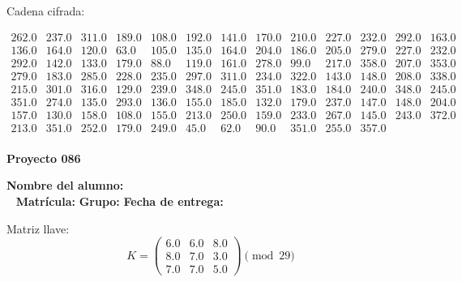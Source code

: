 \documentclass[12pt]{article}
\begin{document}
Cadena cifrada:
\begin{center}
$\begin{array}{lllllllllllll}
262.0 & 237.0 & 311.0 & 189.0 & 108.0 & 192.0 & 141.0 & 170.0 & 210.0 & 227.0 & 232.0 & 292.0 & 163.0\\
136.0 & 164.0 & 120.0 & 63.0 & 105.0 & 135.0 & 164.0 & 204.0 & 186.0 & 205.0 & 279.0 & 227.0 & 232.0\\
292.0 & 142.0 & 133.0 & 179.0 & 88.0 & 119.0 & 161.0 & 278.0 & 99.0 & 217.0 & 358.0 & 207.0 & 353.0\\
279.0 & 183.0 & 285.0 & 228.0 & 235.0 & 297.0 & 311.0 & 234.0 & 322.0 & 143.0 & 148.0 & 208.0 & 338.0\\
215.0 & 301.0 & 316.0 & 129.0 & 239.0 & 348.0 & 245.0 & 351.0 & 183.0 & 184.0 & 240.0 & 348.0 & 245.0\\
351.0 & 274.0 & 135.0 & 293.0 & 136.0 & 155.0 & 185.0 & 132.0 & 179.0 & 237.0 & 147.0 & 148.0 & 204.0\\
157.0 & 130.0 & 158.0 & 108.0 & 155.0 & 213.0 & 250.0 & 159.0 & 233.0 & 267.0 & 145.0 & 243.0 & 372.0\\
213.0 & 351.0 & 252.0 & 179.0 & 249.0 & 45.0 & 62.0 & 90.0 & 351.0 & 255.0 & 357.0\\
\end{array}$
\end{center}

\newpage


\textbf{Proyecto 086}

\textbf{Nombre del alumno:} \underline{\hspace{13cm}}\\\
\vspace{1cm}
\textbf{Matrícula:} \underline{\hspace{4cm}} \hspace{1cm}
\textbf{Grupo:} \underline{\hspace{2cm}}
\textbf{Fecha de entrega:} \underline{\hspace{2cm}}

\medskip

Matriz llave:
\[
K = \begin{pmatrix}
6.0 & 6.0 & 8.0\\
8.0 & 7.0 & 3.0\\
7.0 & 7.0 & 5.0
\end{pmatrix} \pmod{29}
\]
\end{document}
